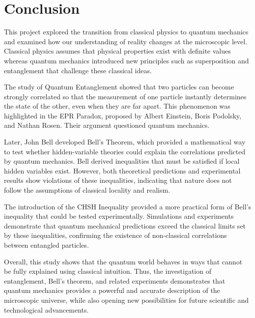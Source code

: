 \documentclass[14pt,a4paper]{extarticle}
\begin{document}
\section{Conclusion}
This project explored the transition from classical physics to quantum mechanics and examined how our understanding of reality changes at the microscopic level. Classical physics assumes that physical properties exist with definite values whereas quantum mechanics introduced new principles such as superposition and entanglement that challenge these classical ideas.

The study of Quantum Entanglement showed that two particles can become strongly correlated so that the measurement of one particle instantly determines the state of the other, even when they are far apart. This phenomenon was highlighted in the EPR Paradox, proposed by Albert Einstein, Boris Podolsky, and Nathan Rosen. Their argument questioned quantum mechanics.

Later, John Bell developed Bell's Theorem, which provided a mathematical way to test whether hidden-variable theories could explain the correlations predicted by quantum mechanics. Bell derived inequalities that must be satisfied if local hidden variables exist. However, both theoretical predictions and experimental results show violations of these inequalities, indicating that nature does not follow the assumptions of classical locality and realism.

The introduction of the CHSH Inequality provided a more practical form of Bell’s inequality that could be tested experimentally. Simulations and experiments demonstrate that quantum mechanical predictions exceed the classical limits set by these inequalities, confirming the existence of non-classical correlations between entangled particles.

Overall, this study shows that the quantum world behaves in ways that cannot be fully explained using classical intuition. Thus, the investigation of entanglement, Bell’s theorem, and related experiments demonstrates that quantum mechanics provides a powerful and accurate description of the microscopic universe, while also opening new possibilities for future scientific and technological advancements.
\end{document}
